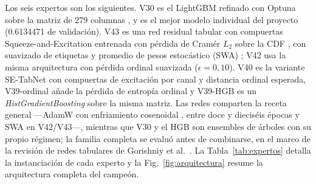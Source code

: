 \documentclass[journal]{IEEEtai}
\begin{document}
Los seis expertos son los siguientes. V30 es el LightGBM refinado con Optuna sobre la matriz de 279 columnas \cite{ke2017}, y es el mejor modelo individual del proyecto (0.6134471 de validaci\'on). V43 es una red residual tabular con compuertas Squeeze-and-Excitation \cite{hu2018} entrenada con p\'erdida de Cram\'er $L_2$ sobre la CDF \cite{cramer1928,vonmises1931,szekely2013,frogner2015}, con suavizado de etiquetas \cite{szegedy2016,muller2019} y promedio de pesos estoc\'astico (SWA) \cite{izmailov2018}; V42 usa la misma arquitectura con p\'erdida ordinal suavizada ($\epsilon=0{,}10$). V40 es la variante SE-TabNet con compuertas de excitaci\'on por canal y distancia ordinal esperada, V39-ordinal a\~nade la p\'erdida de entrop\'ia ordinal \cite{frank2001,diaz2019} y V39-HGB es un \textit{HistGradientBoosting} sobre la misma matriz. Las redes comparten la receta general ---AdamW con enfriamiento cosenoidal \cite{loshchilov2017}, entre doce y diecis\'eis \'epocas y SWA en V42/V43---, mientras que V30 y el HGB son ensembles de \'arboles con su propio r\'egimen; la familia completa se evalu\'o antes de combinarse, en el marco de la revisi\'on de redes tabulares de Gorishniy et al.\ \cite{gorishniy2021}. La Tabla~\ref{tab:expertos} detalla la instanciaci\'on de cada experto y la Fig.~\ref{fig:arquitectura} resume la arquitectura completa del campe\'on.
\end{document}

